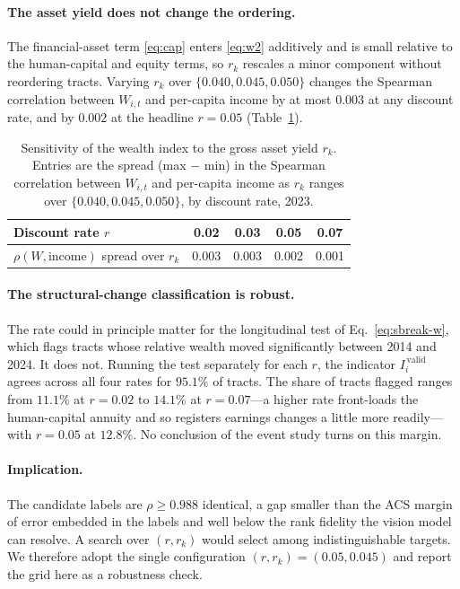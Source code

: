 \paragraph{The asset yield does not change the ordering.}
The financial-asset term \eqref{eq:cap} enters \eqref{eq:w2} additively and is small relative
to the human-capital and equity terms, so $r_k$ rescales a minor component without reordering
tracts. Varying $r_k$ over $\{0.040, 0.045, 0.050\}$ changes the Spearman correlation between
$W_{i,t}$ and per-capita income by at most $0.003$ at any discount rate, and by $0.002$ at the
headline $r=0.05$ (Table~\ref{tab:rk-robust}).

\begin{table}[ht]
\centering
\caption{Sensitivity of the wealth index to the gross asset yield $r_k$. Entries are the
spread (max $-$ min) in the Spearman correlation between $W_{i,t}$ and per-capita income as
$r_k$ ranges over $\{0.040,0.045,0.050\}$, by discount rate, 2023.}
\label{tab:rk-robust}
\begin{tabular}{lcccc}
\toprule
Discount rate $r$ & 0.02 & 0.03 & 0.05 & 0.07 \\
\midrule
$\rho(W,\text{income})$ spread over $r_k$ & 0.003 & 0.003 & 0.002 & 0.001 \\
\bottomrule
\end{tabular}
\end{table}

\paragraph{The structural-change classification is robust.}
The rate could in principle matter for the longitudinal test of Eq.~\eqref{eq:sbreak-w},
which flags tracts whose relative wealth moved significantly between 2014 and 2024. It does
not. Running the test separately for each $r$, the indicator $I^{\,\mathrm{valid}}_{i}$ agrees
across all four rates for $95.1\%$ of tracts. The share of tracts flagged ranges from $11.1\%$
at $r=0.02$ to $14.1\%$ at $r=0.07$---a higher rate front-loads the human-capital annuity and
so registers earnings changes a little more readily---with $r=0.05$ at $12.8\%$. No conclusion
of the event study turns on this margin.

\paragraph{Implication.}
The candidate labels are $\rho \geq 0.988$ identical, a gap smaller than the ACS margin of
error embedded in the labels and well below the rank fidelity the vision model can resolve. A
search over $(r,r_k)$ would select among indistinguishable targets. We therefore adopt the
single configuration $(r,r_k)=(0.05,0.045)$ and report the grid here as a robustness check.
